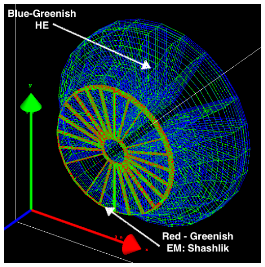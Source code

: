\documentclass[pdf, 9pt]{beamer}
\begin{document}
\begin{frame}[plain]
    \includegraphics[width=\paperwidth]{figs/shashlik_fullscale/Shashlik+HE_Complete_Wire.png}
\end{frame}
\end{document}
